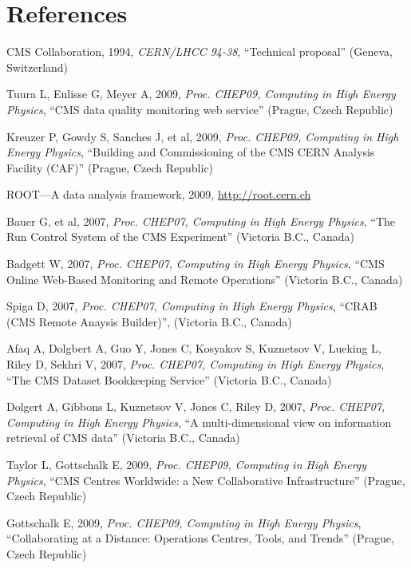 \documentclass[a4paper]{jpconf}
\begin{document}
\section*{References}
\begin{thebibliography}{9}

  CMS Collaboration,
  1994, {\it CERN/LHCC 94-38},
  ``Technical proposal''
  (Geneva, Switzerland)

  Tuura L, Eulisse G, Meyer A,
  2009, {\it Proc. CHEP09, Computing in High Energy Physics},
  ``CMS data quality monitoring web service''
  (Prague, Czech Republic)

  Kreuzer P, Gowdy S, Sanches J, et al,
  2009, {\it Proc. CHEP09, Computing in High Energy Physics},
  ``Building and Commissioning of the CMS CERN Analysis Facility (CAF)''
  (Prague, Czech Republic)

  ROOT---A data analysis framework, 2009, \url{http://root.cern.ch}

  Bauer G, et al,
  2007, {\it Proc. CHEP07, Computing in High Energy Physics},
  ``The Run Control System of the CMS Experiment''
  (Victoria B.C., Canada)

  Badgett W,
  2007, {\it Proc. CHEP07, Computing in High Energy Physics},
  ``CMS Online Web-Based Monitoring and Remote Operations''
  (Victoria B.C., Canada)

  Spiga D,
  2007, {\it Proc. CHEP07, Computing in High Energy Physics},
  ``CRAB (CMS Remote Anaysis Builder)'',
  (Victoria B.C., Canada)

  Afaq A, Dolgbert A, Guo Y, Jones C, Kosyakov S,
  Kuznetsov V, Lueking L, Riley D, Sekhri V,
  2007, {\it Proc. CHEP07, Computing in High Energy Physics},
  ``The CMS Dataset Bookkeeping Service''
  (Victoria B.C., Canada)

  Dolgert A, Gibbons L, Kuznetsov V, Jones C, Riley D,
  2007, {\it Proc. CHEP07, Computing in High Energy Physics},
  ``A multi-dimensional view on information retrieval of CMS data''
  (Victoria B.C., Canada)

  Taylor L, Gottschalk E,
  2009, {\it Proc. CHEP09, Computing in High Energy Physics},
  ``CMS Centres Worldwide: a New Collaborative Infrastructure''
  (Prague, Czech Republic)

  Gottschalk E,
  2009, {\it Proc. CHEP09, Computing in High Energy Physics},
  ``Collaborating at a Distance: Operations Centres, Tools, and Trends''
  (Prague, Czech Republic)

\end{thebibliography}
\end{document}
